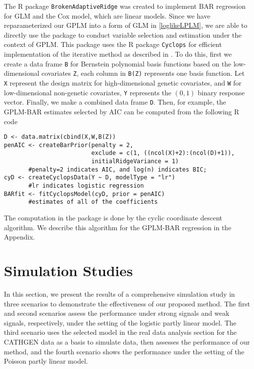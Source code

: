 \documentclass[11pt]{article}
\begin{document}
The R package \verb|BrokenAdaptiveRidge| \citep{kawaguchi2020surrogate} was created to implement BAR regression for GLM and the Cox model, which are linear models. Since we have reparameterized our GPLM into a form of GLM in \eqref{loglikeLPLM}, we are able to directly use the package to conduct variable selection and estimation under the context of GPLM. This package uses the R package \verb|Cyclops| \citep{suchard2013massive} for efficient implementation of the iterative method as described in \cite{kawaguchi2020surrogate}. To do this, first we create a data frame \verb|B| for Bernstein polynomial basis functions based on the low-dimensional covariates \verb|Z|, each column in \verb|B(Z)| represents one basis function. Let \verb|X| represent the design matrix for high-dimensional genetic covariates, and \verb|W| for low-dimensional non-genetic covariates, \verb|Y| represents the $(0,1)$ binary response vector. Finally, we make a combined data frame \verb|D|. Then, for example, the GPLM-BAR estimates selected by AIC can be computed from the following R code
\begin{verbatim}
D <- data.matrix(cbind(X,W,B(Z))
penAIC <- createBarPrior(penalty = 2, 
                         exclude = c(1, ((ncol(X)+2):(ncol(D)+1)), 
                         initialRidgeVariance = 1) 
       #penalty=2 indicates AIC, and log(n) indicates BIC;
cyD <- createCyclopsData(Y ~ D, modelType = "lr") 
       #lr indicates logistic regression
BARfit <- fitCyclopsModel(cyD, prior = penAIC)
       #estimates of all of the coefficients
\end{verbatim}
The computation in the package is done by the cyclic coordinate descent algorithm. We describe this algorithm for the GPLM-BAR regression in the Appendix. 

\section{Simulation Studies} \label{sec:simstudies}
In this section, we present the results of a comprehensive simulation study in three scenarios to demonstrate the effectiveness of our proposed method. The first and second scenarios assess the performance under strong signals and weak signals, respectively, under the setting of the logistic partly linear model. The third scenario uses the selected model in the real data analysis section for the CATHGEN data as a basis to simulate data, then assesses the performance of our method, and the fourth scenario shows the performance under the setting of the Poisson partly linear model. 
\end{document}
